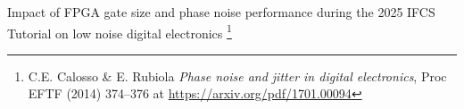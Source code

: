 \documentclass[compress,10pt,aspectratio=169]{beamer}
\begin{document}
\begin{frame}[fragile]
\begin{minipage}[t]{\linewidth}
\begin{minipage}{.495\linewidth}
{\footnotesize
Impact of FPGA gate size and phase noise performance during the
2025 IFCS Tutorial on low noise digital electronics
\footnote{C.E. Calosso \& E. Rubiola {\em Phase noise and jitter in digital electronics},
Proc EFTF (2014) 374--376 at \url{https://arxiv.org/pdf/1701.00094}}\par
}
\end{minipage}
\end{minipage}
\end{frame}
\end{document}
